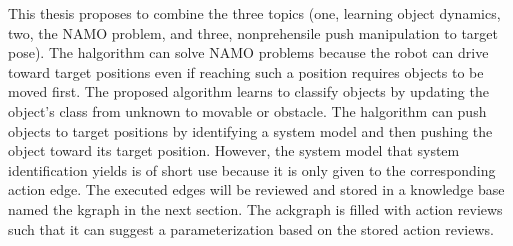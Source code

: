 This thesis proposes to combine the three topics (one, learning object dynamics, two, the \ac{NAMO} problem, and three, nonprehensile push manipulation to target pose). The \ac{halgorithm} can solve \ac{NAMO} problems because the robot can drive toward target positions even if reaching such a position requires objects to be moved first. The proposed algorithm learns to classify objects by updating the object's class from unknown to movable or obstacle. The \ac{halgorithm} can push objects to target positions by identifying a system model and then pushing the object toward its target position. However, the system model that system identification yields is of short use because it is only given to the corresponding action edge. The executed edges will be reviewed and stored in a knowledge base named the \acf{kgraph} in the next section. The ac{kgraph} is filled with action reviews such that it can suggest a parameterization based on the stored action reviews.\bs

